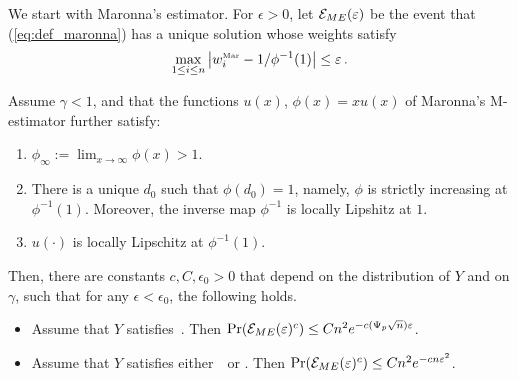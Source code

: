 \documentclass[times,sort&compress,3p]{elsarticle}
\begin{document}
We start with Maronna's estimator. For $\epsilon>0$, let $\mathcal{E}_{ME}(\varepsilon)$ be the event that (\ref{eq:def_maronna}) has a unique solution
whose weights satisfy 
\begin{equation}\label{eq:main-maronna-weights}
    \max_{1\le i \le n} \left|w^{\mbox{\tiny{Mar}}}_i-1/\phi^{-1}(1)\right| \le \varepsilon \,.
\end{equation}
\begin{theorem}
\label{thm:main_maronna}
        Assume $\gamma<1$, and that the functions $u(x)$, $\phi(x)=xu(x)$ 
        of Maronna's M-estimator further satisfy:
        \begin{enumerate}[label=(\roman*)]
            \item $\phi_\infty := \lim_{x\to\infty}\phi(x)>1$.
            \item There is a unique $d_0$ such that $\phi(d_0)=1$, namely, $\phi$ is strictly increasing at $\phi^{-1}(1)$. Moreover, the inverse map $\phi^{-1}$ is locally Lipshitz at $1$.
            \item $u(\cdot)$ is locally Lipschitz at $\phi^{-1}(1)$.
        \end{enumerate}
                Then, there are constants $c,C,\epsilon_0>0$ that depend on the distribution of $Y$ and on $\gamma$, such that for any  $\epsilon<\epsilon_0$,
                the following holds.
               
                \begin{itemize}
                     \item
            Assume that $Y$ satisfies~\AssumLC. Then      $
                    \Pr(\mathcal{E}_{ME}(\varepsilon)^c) \le Cn^2 e^{-c(\Psi_p\sqrt{n})\varepsilon} 
                    $.
                    \item 
     Assume that $Y$ satisfies either~\AssumIndep~or \AssumCCPSB. Then 
                    $
                    \Pr(\mathcal{E}_{ME}(\varepsilon)^c) \le Cn^2 e^{-cn\varepsilon^2} 
                    $.
                \end{itemize}  
\end{theorem}
\end{document}
